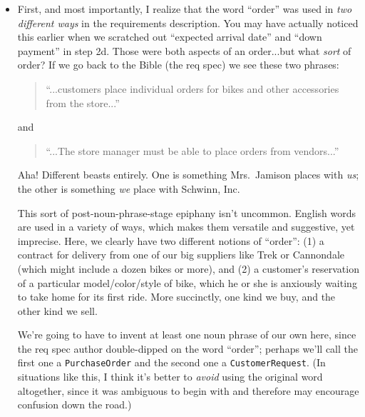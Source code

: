 \begin{itemize}
\itemsep.1em

\item First, and most importantly, I realize that the word ``order'' was used
in \textit{two different ways} in the requirements description. You may have
actually noticed this earlier when we scratched out ``expected arrival date''
and ``down payment'' in step 2d. Those were both aspects of an order...but what
\textit{sort} of order? If we go back to the Bible (the req spec) we see these
two phrases:

\begin{quote}
\textsf{``...customers place individual orders for bikes and other accessories
from the store...''}
\end{quote}

\vspace{-.3in}
\begin{center}
and
\end{center}
\vspace{-.2in}

\begin{quote}
\textsf{``...The store manager must be able to place orders from vendors...''}
\end{quote}

Aha! Different beasts entirely. One is something Mrs.~Jamison places with
\textit{us};
the other is something \textit{we} place with Schwinn, Inc.

This sort of post-noun-phrase-stage epiphany isn't uncommon. English words are
used in a variety of ways, which makes them versatile and suggestive, yet
imprecise. Here, we clearly have two different notions of ``order'': (1) a
contract for delivery from one of our big suppliers like Trek or Cannondale
(which might include a dozen bikes or more), and (2) a customer's reservation
of a particular model/color/style of bike, which he or she is anxiously
waiting to take home for its first ride. More succinctly, one kind we buy, and
the other kind we sell.

We're going to have to invent at least one noun phrase of our own here, since
the req spec author double-dipped on the word ``order''; perhaps we'll call the
first one a \texttt{PurchaseOrder} and the second one a
\texttt{CustomerRequest}. (In situations like this, I think it's better to
\textit{avoid} using the original word altogether, since it was ambiguous to
begin with and therefore may encourage confusion down the road.)


\end{itemize}
